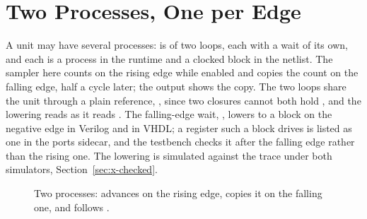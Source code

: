 \section{Two Processes, One per Edge}
\label{sec:x-twoproc}

A unit may have several processes:  is  of two
loops, each with a wait of its own, and each is a process in the
runtime and a clocked block in the netlist. The sampler here counts
on the rising edge while enabled and copies the count on the falling
edge, half a cycle later; the output shows the copy. The two loops
share the unit through a plain reference, , since two
closures cannot both hold , and the lowering reads
 as it reads . The falling-edge
wait, , lowers to a block on the negative edge in
Verilog and  in VHDL; a register such a block
drives is listed as one in the ports sidecar, and the testbench checks
it after the falling edge rather than the rising one. The lowering is
simulated against the trace under both simulators,
Section~\ref{sec:x-checked}.

\begin{figure}[htbp]
\centering

\caption{Two processes:  advances on the rising edge, 
copies it on the falling one, and  follows .}
\label{fig:x-twoproc}
\end{figure}




